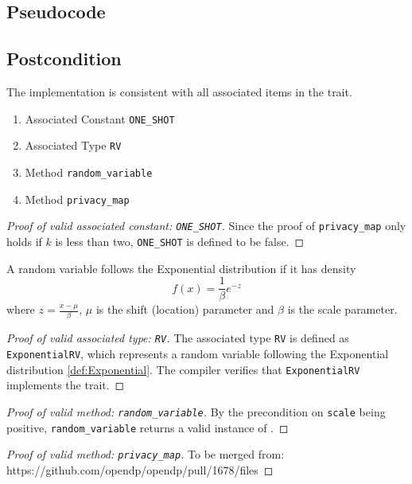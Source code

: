 \documentclass{article}
\begin{document}
\subsection*{Pseudocode} 
\label{sec:python-pseudocode} 
 
 
\subsection*{Postcondition} 
\begin{theorem}
    The implementation is consistent with all associated items in the  trait.
    \begin{enumerate}
        \item Associated Constant \texttt{ONE\_SHOT}
        \item Associated Type \texttt{RV}
        \item Method \texttt{random\_variable} 
        \item Method \texttt{privacy\_map}
    \end{enumerate}
\end{theorem}

\begin{proof}[Proof of valid associated constant: \texttt{ONE\_SHOT}]
    \label{proof:ONE_SHOT}
    Since the proof of \texttt{privacy\_map} only holds if $k$ is less than two,
    \texttt{ONE\_SHOT} is defined to be false.
\end{proof}

\begin{definition}
    \label{def:Exponential}
    A random variable follows the Exponential distribution if it has density
    \begin{equation}
        f(x) = \frac{1}{\beta} e^{-z}
    \end{equation}
    where $z = \frac{x - \mu}{\beta}$,
    $\mu$ is the shift (location) parameter and $\beta$ is the scale parameter.
\end{definition}

\begin{proof}[Proof of valid associated type: \texttt{RV}]
    The associated type \texttt{RV} is defined as \texttt{ExponentialRV},
    which represents a random variable following the Exponential distribution \ref{def:Exponential}.
    The compiler verifies that \texttt{ExponentialRV} implements the  trait.
\end{proof}

\begin{proof}[Proof of valid method: \texttt{random\_variable}]
    By the precondition on \texttt{scale} being positive, 
    \texttt{random\_variable} returns a valid instance of .
\end{proof}

\begin{proof}[Proof of valid method: \texttt{privacy\_map}]
    To be merged from: https://github.com/opendp/opendp/pull/1678/files
\end{proof}
\end{document}
